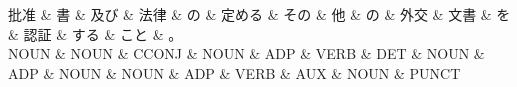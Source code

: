 \documentclass[tikz,border=5pt]{standalone}
\begin{document}
\normalsize
\begin{dependency}[edge unit distance=12.0pt]
    \begin{deptext}[column sep=1em]
        批准 \& 書 \& 及び \& 法律 \& の \& 定める \& その \& 他 \& の \& 外交 \& 文書 \& を \& 認証 \& する \& こと \& 。\\
        NOUN \& NOUN \& CCONJ \& NOUN \& ADP \& VERB \& DET \& NOUN \& ADP \& NOUN \& NOUN \& ADP \& VERB \& AUX \& NOUN \& PUNCT\\
    \end{deptext}
\end{dependency}
\end{document}
